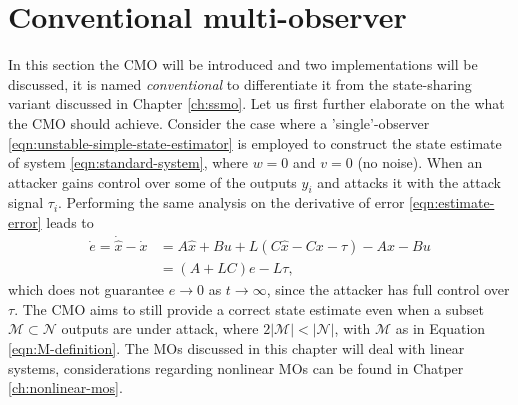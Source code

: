 \section{Conventional multi-observer}\label{ch:cmo}
In this section the CMO will be introduced and two implementations will be discussed, it is named \textit{conventional} to differentiate it from the state-sharing variant discussed in Chapter \ref{ch:ssmo}. Let us first further elaborate on the what the CMO should achieve. Consider the case where a 'single'-observer \eqref{eqn:unstable-simple-state-estimator} is employed to construct the state estimate of system \eqref{eqn:standard-system}, where $w=0$ and $v=0$ (no noise). When an attacker gains control over some of the outputs $y_i$ and attacks it with the attack signal $\tau_i$. Performing the same analysis on the derivative of error \eqref{eqn:estimate-error} leads to
\begin{equation*}
    \begin{split}
        \dot{e} = \dot{\hat{x}} - \dot{x} &= A\hat{x} + Bu + L(C\hat{x} - Cx - \tau) - Ax - Bu \\
        &= (A+LC)e - L\tau,
    \end{split}
\end{equation*}
which does not guarantee $e \rightarrow 0$ as $t \rightarrow \infty$, since the attacker has full control over $\tau$. The CMO aims to still provide a correct state estimate even when a subset $\mathcal{M} \subset \mathcal{N}$ outputs are under attack, where $2|\mathcal{M}| < |\mathcal{N}|$, with $\mathcal{M}$ as in Equation \eqref{eqn:M-definition}. The MOs discussed in this chapter will deal with linear systems, considerations regarding nonlinear MOs can be found in Chatper \ref{ch:nonlinear-mos}.

